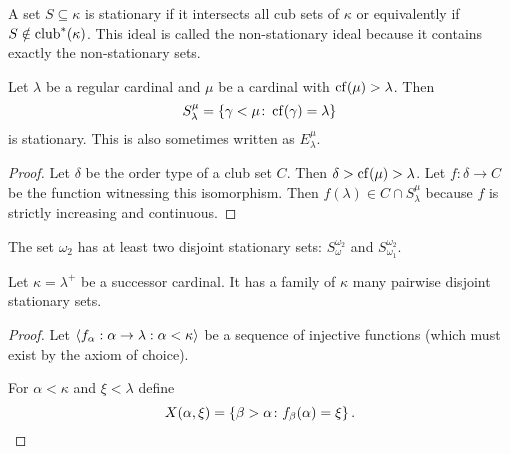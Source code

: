 \begin{definition}
    A set \(S\subseteq\kappa\) is stationary if it intersects all cub sets of
    \(\kappa\) or equivalently if \(S\notin\operatorname{club}^{*}(\kappa)\). This ideal is
    called the non-stationary ideal because it contains exactly the
    non-stationary sets.
\end{definition}

\begin{proposition}
    Let \(\lambda\) be a regular cardinal and \(\mu\) be a cardinal with
    \(\operatorname{cf}(\mu)>\lambda\). Then
    \[
        S^{\mu}_{\lambda}=\left\{\gamma<\mu\colon\operatorname{cf}(\gamma)=\lambda\right\}
    \]
    is stationary. This is also sometimes written as \(E^{\mu}_{\lambda}\).

    \begin{proof}
        Let \(\delta\) be the order type of a club set \(C\). Then
        \(\delta>\operatorname{cf}(\mu)>\lambda\). Let \(f:\delta\to C\) be the function
        witnessing this isomorphism. Then \(f(\lambda)\in C\cap
        S^{\mu}_{\lambda}\) because \(f\) is strictly increasing and continuous.
    \end{proof}
\end{proposition}

\begin{example}
    The set \(\omega_{2}\) has at least two disjoint stationary sets:
    \(S^{\omega_{2}}_{\omega}\) and \(S^{\omega_{2}}_{\omega_{1}}\).
\end{example}

\begin{proposition}
    Let \(\kappa=\lambda^{+}\) be a successor cardinal. It has a family of
    \(\kappa\) many pairwise disjoint stationary sets.

    \begin{proof}
        Let \(\left<f_{\alpha}:\alpha\to\lambda:\alpha<\kappa\right>\) be a
        sequence of injective functions (which must exist by the axiom of
        choice).

        For \(\alpha<\kappa\) and \(\xi<\lambda\) define
        \[
            X(\alpha,\xi)=\left\{\beta>\alpha\colon f_{\beta}(\alpha)=\xi\right\}.
        \]
    \end{proof}
\end{proposition}

